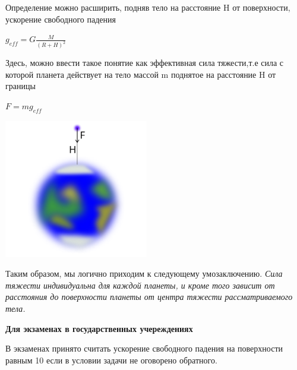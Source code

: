 \documentclass[12pt, letterpaper, twoside]{article}
\begin{document}
Определение можно расширить, подняв тело на расстояние H от поверхности, ускорение свободного падения
\begin{center}
   $g_{eff} = G\frac{M}{(R+H)^2}$
\end{center}


Здесь, можно ввести такое понятие как эффективная сила тяжести,т.е сила с которой планета действует на тело массой m поднятое на расстояние H от границы 
\begin{center}
  $F=mg_{eff}$
\end{center}
\begin{center}
   \qquad \includegraphics{zvt4.png}\\
\end{center}



Таким образом, мы логично приходим к следующему умозаключению. \textit{Сила тяжести индивидуальна для каждой планеты, и кроме того зависит от расстояния до поверхности планеты от центра тяжести рассматриваемого тела.}
\begin{center}
  \textbf{Для экзаменах в государственных учереждениях } 
\end{center}

В экзаменах принято считать ускорение свободного падения на поверхности равным 10  если в условии задачи не оговорено обратного.
\end{document}
